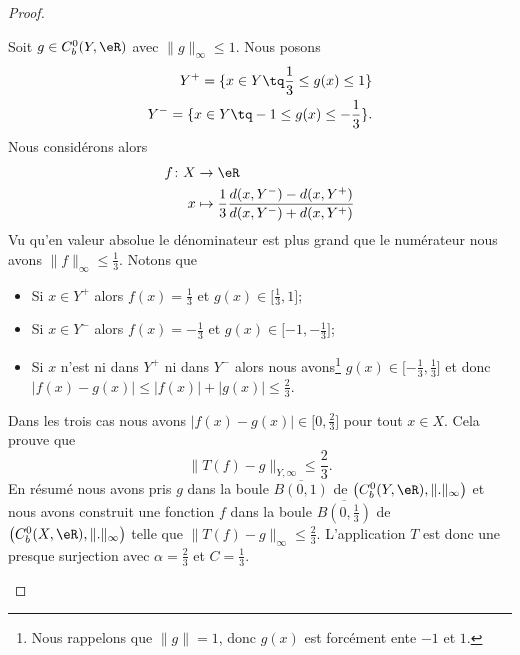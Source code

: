 \begin{proof}
\begin{subproof}
		Soit \( g\in C^0_b(Y,\eR)\) avec \( \| g \|_{\infty}\leq 1\). Nous posons
		\begin{subequations}
			\begin{align}
				Y^+=\{ x\in Y\tq \frac{1}{ 3 }\leq g(x)\leq 1 \} \\
				Y^-=\{ x\in Y\tq -1\leq g(x)\leq -\frac{1}{ 3 } \}.
			\end{align}
		\end{subequations}
		Nous considérons alors
		\begin{equation}
			\begin{aligned}
				f\colon X & \to \eR                                                              \\
				x         & \mapsto \frac{1}{ 3 }\frac{ d(x,Y^-)-d(x,Y^+) }{ d(x,Y^-)+d(x,Y^+) }
			\end{aligned}
		\end{equation}
		Vu qu'en valeur absolue le dénominateur est plus grand que le numérateur nous avons \( \| f \|_{\infty}\leq \frac{1}{ 3 }\). Notons que
		\begin{itemize}
			\item Si \( x\in Y^+\) alors \( f(x)=\frac{1}{ 3 }\) et \( g(x)\in\mathopen[ \frac{1}{ 3 } , 1 \mathclose]\);
			\item Si \( x\in Y^-\) alors \( f(x)=-\frac{1}{ 3 }\) et \( g(x)\in\mathopen[-1,-\frac{1}{ 3 } \mathclose]\);
			\item Si \( x\) n'est ni dans \( Y^+\) ni dans \( Y^-\) alors nous avons\footnote{Nous rappelons que \( \| g \|=1\), donc \( g(x)\) est forcément ente \( -1\) et \( 1\).} \( g(x)\in\mathopen[ -\frac{1}{ 3 } , \frac{1}{ 3 } \mathclose]\) et donc \( \big| f(x)-g(x) \big|\leq \big| f(x) \big|+\big| g(x) \big|\leq \frac{ 2 }{ 3 }\).
		\end{itemize}
		Dans les trois cas nous avons \( \big| f(x)-g(x) \big|\in\mathopen[ 0 , \frac{ 2 }{ 3 } \mathclose]\) pour tout \( x\in X\). Cela prouve que
		\begin{equation}
			\| T(f)-g \|_{Y,\infty}\leq \frac{ 2 }{ 3 }.
		\end{equation}
		En résumé nous avons pris \( g\) dans la boule \( \overline{ B(0,1) }\) de \( \big( C^0_b(Y,\eR), \| . \|_{\infty} \big)\) et nous avons construit une fonction \( f\) dans la boule \( \overline{ B(0,\frac{1}{ 3 }) }\) de \( \big( C^0_b(X,\eR),\| . \|_{\infty} \big)\) telle que \( \| T(f)-g \|_{\infty}\leq \frac{ 2 }{ 3 }\). L'application \( T\) est donc une presque surjection avec \( \alpha=\frac{2}{ 3 }\) et \( C=\frac{ 1 }{ 3 }\).


\end{subproof}
\end{proof}

